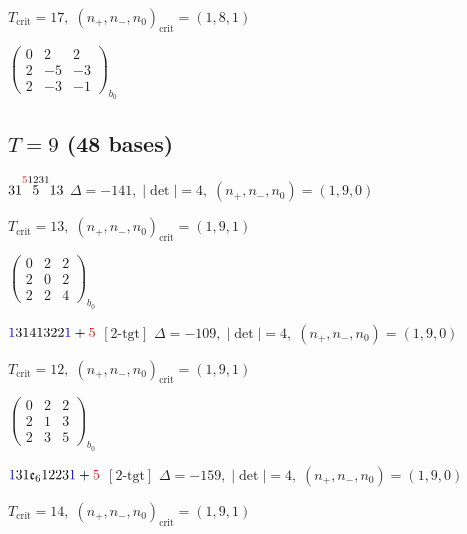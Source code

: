 \documentclass[10pt]{article}
\begin{document}
\hspace{1em}$T_{\text{crit}}=17,\; (n_+,n_-,n_0)_{\text{crit}}=(1,8,1)$

\hspace{2em}$\left(\begin{smallmatrix}0 & 2 & 2 \\ 2 & -5 & -3 \\ 2 & -3 & -1\end{smallmatrix}\right)_{\!b_0}$


\subsection*{$T = 9$ \quad (48 bases)}
\smallskip

$31\overset{\textcolor{red}{5}1231}{5}13$ \quad $\Delta=-141,\; |\det|=4,\; (n_+,n_-,n_0)=(1,9,0)$

\hspace{1em}$T_{\text{crit}}=13,\; (n_+,n_-,n_0)_{\text{crit}}=(1,9,1)$

\hspace{2em}$\left(\begin{smallmatrix}0 & 2 & 2 \\ 2 & 0 & 2 \\ 2 & 2 & 4\end{smallmatrix}\right)_{\!b_0}$

\smallskip

$\textcolor{blue}{1}3141322\textcolor{blue}{1}+\textcolor{red}{5}$ $\scriptstyle [2\text{-tgt}]$ \quad $\Delta=-109,\; |\det|=4,\; (n_+,n_-,n_0)=(1,9,0)$

\hspace{1em}$T_{\text{crit}}=12,\; (n_+,n_-,n_0)_{\text{crit}}=(1,9,1)$

\hspace{2em}$\left(\begin{smallmatrix}0 & 2 & 2 \\ 2 & 1 & 3 \\ 2 & 3 & 5\end{smallmatrix}\right)_{\!b_0}$

\smallskip

$\textcolor{blue}{1}31\mathfrak{e}_61223\textcolor{blue}{1}+\textcolor{red}{5}$ $\scriptstyle [2\text{-tgt}]$ \quad $\Delta=-159,\; |\det|=4,\; (n_+,n_-,n_0)=(1,9,0)$

\hspace{1em}$T_{\text{crit}}=14,\; (n_+,n_-,n_0)_{\text{crit}}=(1,9,1)$
\end{document}
